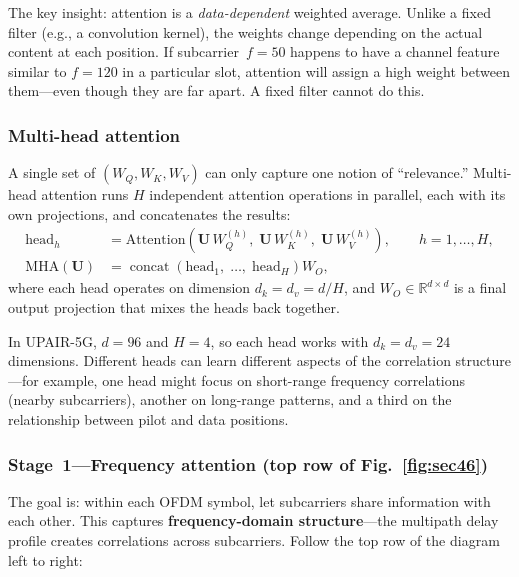 \documentclass[11pt,a4paper]{article}
\DeclareMathOperator{\Concat}{concat}
\begin{document}
	\begin{warning}
		The key insight: attention is a \emph{data-dependent} weighted average.  Unlike a fixed filter (e.g., a convolution kernel), the weights change depending on the actual content at each position.  If subcarrier~$f\!=\!50$ happens to have a channel feature similar to $f\!=\!120$ in a particular slot, attention will assign a high weight between them---even though they are far apart.  A fixed filter cannot do this.
	\end{warning}
	
	\subsubsection*{Multi-head attention}
	
	A single set of $(W_Q, W_K, W_V)$ can only capture one notion of ``relevance.''  Multi-head attention runs $H$ independent attention operations in parallel, each with its own projections, and concatenates the results:
	\begin{align}
		\mathrm{head}_h &= \mathrm{Attention}\!\left(\mathbf{U}\,W_Q^{(h)},\; \mathbf{U}\,W_K^{(h)},\; \mathbf{U}\,W_V^{(h)}\right), \qquad h = 1,\dots,H, \label{eq:mha_head}\\
		\mathrm{MHA}(\mathbf{U}) &= \Concat\!\left(\mathrm{head}_1,\;\dots,\;\mathrm{head}_H\right) W_O, \label{eq:mha_concat}
	\end{align}
	where each head operates on dimension $d_k = d_v = d/H$, and $W_O \in \mathbb{R}^{d \times d}$ is a final output projection that mixes the heads back together.
	
	In UPAIR-5G, $d\!=\!96$ and $H\!=\!4$, so each head works with $d_k\!=\!d_v\!=\!24$ dimensions.  Different heads can learn different aspects of the correlation structure---for example, one head might focus on short-range frequency correlations (nearby subcarriers), another on long-range patterns, and a third on the relationship between pilot and data positions.
	
	\subsubsection*{Stage~1---Frequency attention (top row of Fig.~\ref{fig:sec46})}
	
	The goal is: within each OFDM symbol, let subcarriers share information with each other.  This captures \textbf{frequency-domain structure}---the multipath delay profile creates correlations across subcarriers.  Follow the top row of the diagram left to right:
	
\end{document}
